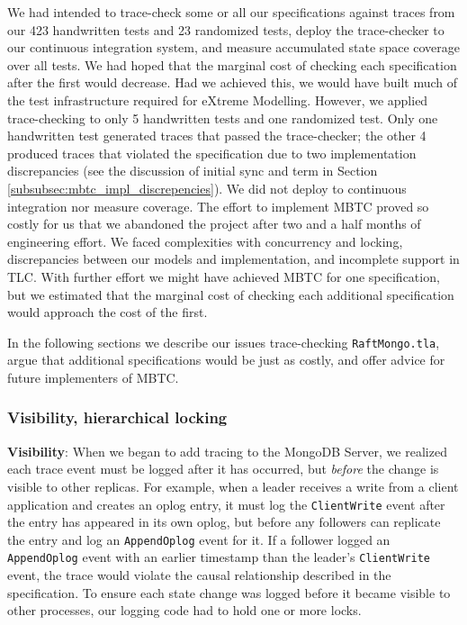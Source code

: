 \documentclass{vldb}
\begin{document}
We had intended to trace-check some or all our specifications against traces from our 423 handwritten tests and 23 randomized tests, deploy the trace-checker to our continuous integration system, and measure accumulated state space coverage over all tests. 
We had hoped that the marginal cost of checking each specification after the first would decrease.
Had we achieved this, we would have built much of the test infrastructure required for eXtreme Modelling.
However, we applied trace-checking to only 5 handwritten tests and one randomized test. 
Only one handwritten test generated traces that passed the trace-checker; the other 4 produced traces that violated the specification due to two implementation discrepancies (see the discussion of initial sync and term in Section \ref{subsubsec:mbtc_impl_discrepencies}). 
We did not deploy to continuous integration nor measure coverage. 
The effort to implement MBTC proved so costly for us that we abandoned the project after two and a half months of engineering effort. 
We faced complexities with concurrency and locking, discrepancies between our models and implementation, and incomplete support in TLC. 
With further effort we might have achieved MBTC for one specification, but we estimated that the marginal cost of checking each additional specification would approach the cost of the first.

In the following sections we describe our issues trace-checking \texttt{RaftMongo.tla}, argue that additional specifications would be just as costly, and offer advice for future implementers of MBTC.

\subsubsection{Visibility, hierarchical locking}
\label{subsubsec:mbtc_locking}

\textbf{Visibility}: When we began to add tracing to the MongoDB Server, we realized each trace event must be logged after it has occurred, but \textit{before} the change is visible to other replicas. 
For example, when a leader receives a write from a client application and creates an oplog entry, it must log the \texttt{ClientWrite} event after the entry has appeared in its own oplog, but before any followers can replicate the entry and log an \texttt{AppendOplog} event for it. 
If a follower logged an \texttt{AppendOplog} event with an earlier timestamp than the leader's \texttt{ClientWrite} event, the trace would violate the causal relationship described in the specification. 
To ensure each state change was logged before it became visible to other processes, our logging code had to hold one or more locks.
\end{document}
